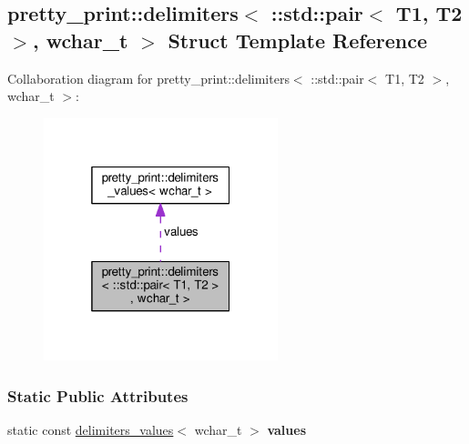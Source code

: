 \hypertarget{structpretty__print_1_1delimiters_3_01_1_1std_1_1pair_3_01T1_00_01T2_01_4_00_01wchar__t_01_4}{}\subsection{pretty\+\_\+print\+:\+:delimiters$<$ \+:\+:std\+:\+:pair$<$ T1, T2 $>$, wchar\+\_\+t $>$ Struct Template Reference}
\label{structpretty__print_1_1delimiters_3_01_1_1std_1_1pair_3_01T1_00_01T2_01_4_00_01wchar__t_01_4}


Collaboration diagram for pretty\+\_\+print\+:\+:delimiters$<$ \+:\+:std\+:\+:pair$<$ T1, T2 $>$, wchar\+\_\+t $>$\+:\nopagebreak
\begin{figure}[H]
\begin{center}
\leavevmode
\includegraphics[width=193pt]{structpretty__print_1_1delimiters_3_01_1_1std_1_1pair_3_01T1_00_01T2_01_4_00_01wchar__t_01_4__coll__graph}
\end{center}
\end{figure}
\subsubsection*{Static Public Attributes}
\begin{DoxyCompactItemize}
\item 
static const \hyperlink{structpretty__print_1_1delimiters__values}{delimiters\+\_\+values}$<$ wchar\+\_\+t $>$ {\bfseries values}\hypertarget{structpretty__print_1_1delimiters_3_01_1_1std_1_1pair_3_01T1_00_01T2_01_4_00_01wchar__t_01_4_ac6797cacef99da473bb0d7c4e09ac8af}{}\label{structpretty__print_1_1delimiters_3_01_1_1std_1_1pair_3_01T1_00_01T2_01_4_00_01wchar__t_01_4_ac6797cacef99da473bb0d7c4e09ac8af}

\end{DoxyCompactItemize}


